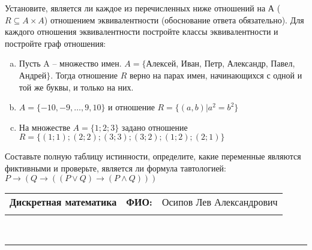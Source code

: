 \documentclass[10pt]{exam}
\newcommand{\class}{Дискретная математика}
\newcommand{\examdate}{}
\begin{document}
\begin{questions}
\question
Установите, является ли каждое из перечисленных ниже отношений на А ($R \subseteq A \times A$) отношением эквивалентности (обоснование ответа обязательно). Для каждого отношения эквивалентности постройте классы 
эквивалентности и постройте граф отношения:
\begin{enumerate} [a)]\setcounter{enumi}{0}
\item Пусть A – множество имен. $A = \{ $Алексей, Иван, Петр, Александр, Павел, Андрей$ \}$. Тогда отношение $R$ верно на парах имен, начинающихся с одной и той же буквы, и только на них.
\item $A = \{-10, -9, … , 9, 10\}$ и отношение $ R = \{(a,b)|a^{2} = b^{2}\}$
\item На множестве $A = \{1; 2; 3\}$ задано отношение $R = \{(1; 1); (2; 2); (3; 3); (3; 2); (1; 2); (2; 1)\}$
\end{enumerate}\question Составьте полную таблицу истинности, определите, какие переменные являются фиктивными и проверьте, является ли формула тавтологией:
$ P \rightarrow (Q \rightarrow ((P \lor Q) \rightarrow (P \land Q)))$

\end{questions}
\newpage
\begin{flushright}
\begin{tabular}{p{2.8in} r l}
\textbf{\class} & \textbf{ФИО:} &Осипов Лев Александрович
\\

\textbf{\examdate} &&\\
\end{tabular}\\
\end{flushright}
\rule[1ex]{\textwidth}{.1pt}
\end{document}
